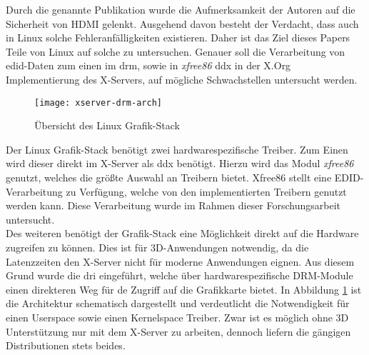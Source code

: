 Durch die genannte Publikation wurde die Aufmerksamkeit der Autoren auf die Sicherheit von HDMI gelenkt. Ausgehend davon besteht der Verdacht, dass auch in Linux solche Fehleranfälligkeiten existieren. Daher ist das Ziel dieses Papers Teile von Linux auf solche zu untersuchen. Genauer soll die Verarbeitung von \acrshort{edid}-Daten zum einen im \acrfull{drm}, sowie in \emph{xfree86} \gls{ddx} in der X.Org Implementierung des X-Servers, auf mögliche Schwachstellen untersucht werden.\\

\begin{figure}[H]
	\centering
	\texttt{[image: xserver-drm-arch]}
	\caption{Übersicht des Linux Grafik-Stack}
	\label{fig:linux-graphic-stack}
\end{figure}

Der Linux Grafik-Stack benötigt zwei hardwarespezifische Treiber. Zum Einen wird dieser direkt im X-Server als \gls{ddx} benötigt. 
Hierzu wird das Modul \emph{xfree86} genutzt, welches die größte Auswahl an Treibern bietet. 
Xfree86 stellt eine EDID-Verarbeitung zu Verfügung, welche von den implementierten Treibern genutzt werden kann. 
Diese Verarbeitung wurde im Rahmen dieser Forschungsarbeit untersucht. \\


Des weiteren benötigt der Grafik-Stack eine Möglichkeit direkt auf die
Hardware zugreifen zu können. Dies ist für 3D-Anwendungen notwendig, da die Latenzzeiten den X-Server nicht für moderne Anwendungen eignen.
Aus diesem Grund wurde die \gls{dri} eingeführt, welche über hardwarespezifische DRM-Module einen direkteren Weg für de Zugriff auf die Grafikkarte bietet.
In Abbildung \ref{fig:linux-graphic-stack} ist die Architektur schematisch dargestellt und verdeutlicht die Notwendigkeit für einen Userspace sowie einen Kernelspace Treiber.
Zwar ist es möglich ohne 3D Unterstützung nur mit dem X-Server zu arbeiten, dennoch liefern die gängigen Distributionen stets beides.





